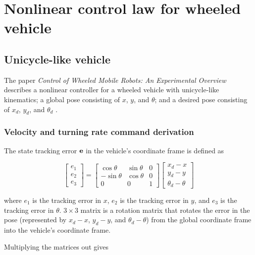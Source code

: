 \section{Nonlinear control law for wheeled vehicle}

\subsection{Unicycle-like vehicle}

The paper \textit{Control of Wheeled Mobile Robots: An Experimental Overview}
describes a nonlinear controller for a wheeled vehicle with unicycle-like
kinematics; a global \gls{pose} consisting of $x$, $y$, and $\theta$; and a
desired \gls{pose} consisting of $x_d$, $y_d$, and $\theta_d$
\cite{bib:ctrl_wheeled_mobile_robots}.

\subsubsection{Velocity and turning rate command derivation}

The \gls{state} tracking \gls{error} $\mathbf{e}$ in the vehicle's coordinate frame
is defined as

\begin{equation*}
  \begin{bmatrix}
    e_1 \\
    e_2 \\
    e_3
  \end{bmatrix} =
  \begin{bmatrix}
    \cos\theta & \sin\theta & 0 \\
    -\sin\theta & \cos\theta & 0 \\
    0 & 0 & 1
  \end{bmatrix}
  \begin{bmatrix}
    x_d - x \\
    y_d - y \\
    \theta_d - \theta
  \end{bmatrix}
\end{equation*}

where $e_1$ is the tracking \gls{error} in $x$, $e_2$ is the tracking
\gls{error} in $y$, and $e_3$ is the tracking \gls{error} in $\theta$.
$3 \times 3$ matrix is a rotation matrix that rotates the \gls{error} in the
\gls{pose} (represented by $x_d - x$, $y_d - y$, and $\theta_d - \theta$) from
the global coordinate frame into the vehicle's coordinate frame.

Multiplying the matrices out gives

